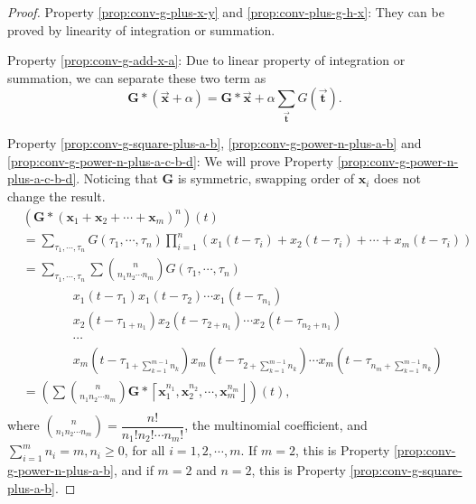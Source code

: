 \documentclass[twoside,11pt]{article}
\def\tvar#1{\mathbf{#1}} %
\def\vsymb#1{\vec{\mathbf{#1}}}
\def\lcerfl#1{\left\lceil{#1}\right\rfloor}
\begin{document}
\begin{proof}

  Property \ref{prop:conv-g-plus-x-y} and \ref{prop:conv-plus-g-h-x}: They can be proved by linearity of integration or summation.

  Property \ref{prop:conv-g-add-x-a}: Due to linear property of integration or summation, we can separate these two term as
  \begin{equation*}
    \tvar{G} * (\vsymb{x} + \alpha)
    = \tvar{G} * \vsymb{x} + \alpha \sum_{\vsymb{t}} G(\vsymb{t}).
  \end{equation*}

  Property \ref{prop:conv-g-square-plus-a-b}, \ref{prop:conv-g-power-n-plus-a-b} and \ref{prop:conv-g-power-n-plus-a-c-b-d}: We will prove Property \ref{prop:conv-g-power-n-plus-a-c-b-d}. Noticing that \(\tvar{G}\) is symmetric, swapping order of \(\tvar{x}_i\) does not change the result.
  \begin{equation*}
    \begin{aligned}
       & \left(\tvar{G} * (\tvar{x}_1 + \tvar{x}_2 + \cdots + \tvar{x}_m)^n\right)(t)                                                                   \\
       & = \sum_{\tau_1, \cdots, \tau_n} G(\tau_1, \cdots, \tau_n) \prod_{i=1}^{n} (x_1(t - \tau_i) + x_2(t - \tau_i) + \cdots + x_m(t - \tau_i))       \\
       & = \sum_{\tau_1, \cdots, \tau_n} \sum \binom{n}{n_1 n_2 \cdots n_m} G(\tau_1, \cdots, \tau_n)                                                   \\
       & \qquad\qquad x_1(t - \tau_1) x_1(t - \tau_2) \cdots x_1(t-\tau_{n_1})                                                                          \\
       & \qquad\qquad x_2(t - \tau_{1 + n_1}) x_2(t - \tau_{2 + n_1}) \cdots x_2(t-\tau_{n_2 + n_1})                                                    \\
       & \qquad\qquad \cdots                                                                                                                            \\
       & \qquad\qquad x_m(t - \tau_{1 + \sum_{k=1}^{m-1} n_k}) x_m(t - \tau_{2 + \sum_{k=1}^{m-1} n_k}) \cdots x_m(t-\tau_{n_m + \sum_{k=1}^{m-1} n_k}) \\
       & = \left(\sum \binom{n}{n_1 n_2 \cdots n_m} \tvar{G} * \lcerfl{\tvar{x}_1^{n_1}, \tvar{x}_2^{n_2}, \cdots, \tvar{x}_m^{n_m}}\right)(t),         \\
    \end{aligned}
  \end{equation*}
  where \(\binom{n}{n_1 n_2 \cdots n_m} = \dfrac{n!}{n_1! n_2! \cdots n_m!}\), the multinomial coefficient, and \(\sum_{i=1}^{m} n_i = m, n_i \ge 0\), for all \(i = 1, 2, \cdots, m\).
  If \(m=2\), this is Property \ref{prop:conv-g-power-n-plus-a-b}, and if \(m=2\) and \(n=2\), this is Property \ref{prop:conv-g-square-plus-a-b}.


\end{proof}
\end{document}
